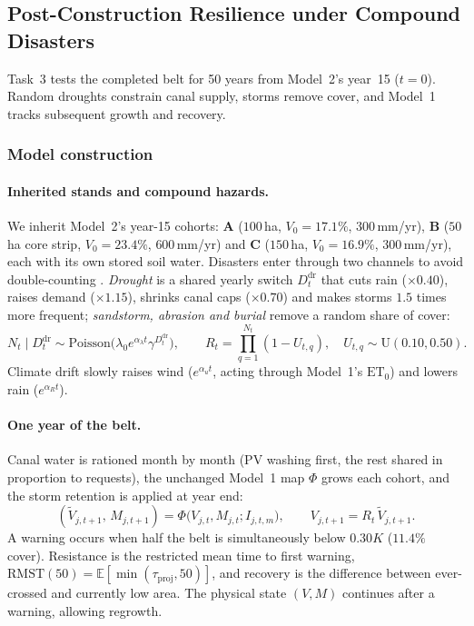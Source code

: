 \clearpage
\subsection{Post-Construction Resilience under Compound Disasters}\label{sec:model3}
Task~3 tests the completed belt for 50 years from Model~2's year~15 ($t=0$). Random droughts constrain canal supply, storms remove cover, and Model~1 tracks subsequent growth and recovery.

\subsubsection[Drought Rationing and Storm Damage]{Model construction}
\paragraph{Inherited stands and compound hazards.} We inherit Model~2's year-15 cohorts: \textbf{A} ($100$\,ha, $V_0=17.1\%$, $300$\,mm/yr), \textbf{B} ($50$\,ha core strip, $V_0=23.4\%$, $600$\,mm/yr) and \textbf{C} ($150$\,ha, $V_0=16.9\%$, $300$\,mm/yr), each with its own stored soil water. Disasters enter through two channels to avoid double-counting \cite{EN14,EN15}. \emph{Drought} is a shared yearly switch $D_t^{\mathrm{dr}}$ that cuts rain ($\times0.40$), raises demand ($\times1.15$), shrinks canal caps ($\times0.70$) and makes storms $1.5$ times more frequent; \emph{sandstorm, abrasion and burial} remove a random share of cover:
\begin{equation}\label{eq:m3-hazard}
N_t\mid D_t^{\mathrm{dr}}\sim\mathrm{Poisson}\big(\lambda_0 e^{\alpha_\lambda t}\gamma^{D_t^{\mathrm{dr}}}\big),\qquad
R_t=\prod_{q=1}^{N_t}(1-U_{t,q}),\quad U_{t,q}\sim\mathrm{U}(0.10,0.50).
\end{equation}
Climate drift slowly raises wind ($e^{\alpha_u t}$, acting through Model~1's $\mathrm{ET}_0$) and lowers rain ($e^{\alpha_R t}$).

\paragraph{One year of the belt.} Canal water is rationed month by month (PV washing first, the rest shared in proportion to requests), the unchanged Model~1 map $\Phi$ grows each cohort, and the storm retention is applied at year end:
\begin{equation}\label{eq:m3-step}
(\widetilde V_{j,t+1},\,M_{j,t+1})=\Phi\big(V_{j,t},M_{j,t};I_{j,t,m}\big),\qquad V_{j,t+1}=R_t\,\widetilde V_{j,t+1}.
\end{equation}
A warning occurs when half the belt is simultaneously below $0.30K$ ($11.4\%$ cover). Resistance is the restricted mean time to first warning, $\mathrm{RMST}(50)=\mathbb E[\min(\tau_{\mathrm{proj}},50)]$, and recovery is the difference between ever-crossed and currently low area. The physical state $(V,M)$ continues after a warning, allowing regrowth.

